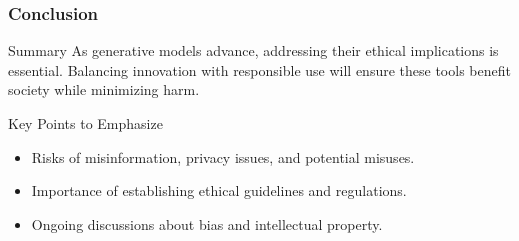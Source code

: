\documentclass[aspectratio=169]{beamer}
\begin{document}
\begin{frame}[fragile]
    \frametitle{Conclusion}
    \begin{block}{Summary}
        As generative models advance, addressing their ethical implications is essential. Balancing innovation with responsible use will ensure these tools benefit society while minimizing harm.
    \end{block}

    \begin{block}{Key Points to Emphasize}
        \begin{itemize}
            \item Risks of misinformation, privacy issues, and potential misuses.
            \item Importance of establishing ethical guidelines and regulations.
            \item Ongoing discussions about bias and intellectual property.
        \end{itemize}
    \end{block}
\end{frame}
\end{document}
